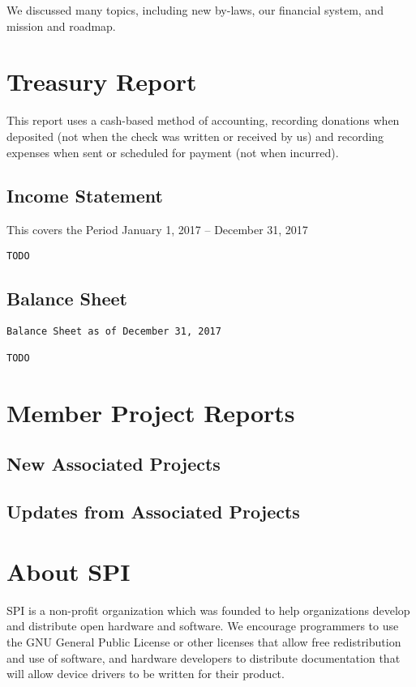 \documentclass[letterpaper]{report}
\begin{document}
We discussed many topics, including new by-laws, our financial system,
and mission and roadmap.

\chapter{Treasury Report}

This report uses a cash-based method of accounting, recording donations when
deposited (not when the check was written or received by us) and recording
expenses when sent or scheduled for payment (not when incurred).

\section{Income Statement}

This covers the Period January 1, 2017 -- December 31, 2017

\begin{verbatim}
TODO
\end{verbatim}

\section{Balance Sheet}

\begin{verbatim}
Balance Sheet as of December 31, 2017

TODO
\end{verbatim}

\chapter{Member Project Reports}

\section{New Associated Projects}

\section{Updates from Associated Projects}


\appendix
\chapter{About SPI}

SPI is a non-profit organization which was founded to help organizations
develop and distribute open hardware and software. We encourage programmers
to use the GNU General Public License or other licenses that allow free
redistribution and use of software, and hardware developers to distribute
documentation that will allow device drivers to be written for their product.
\end{document}
